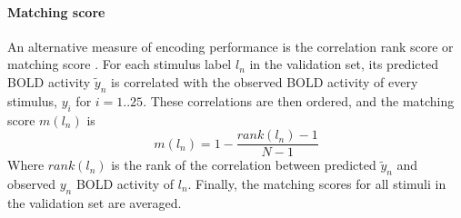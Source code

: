 \paragraph{Matching score}
%
An alternative measure of encoding performance is the correlation rank score or
matching score \citep{SF14}. For each stimulus label $l_{n}$ in the validation set,
its predicted BOLD activity $\widetilde{y}_{n}$ is correlated with the
observed BOLD activity of every stimulus, $y_{i}$ for $i=1..25$. These
correlations are then ordered, and the  matching score $m(l_{n})$ is \[
m(l_{n}) = 1-\frac{rank(l_{n})-1}{N-1} \] Where $rank(l_{n})$ is the rank of
the correlation between predicted $\widetilde{y}_{n}$ and observed $y_{n}$
BOLD activity of $l_{n}$. Finally, the matching scores for all stimuli in the
validation set are averaged.



